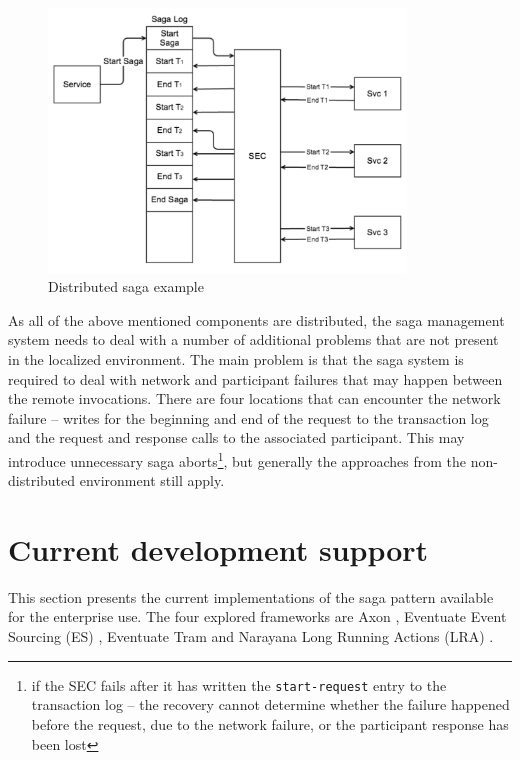 \documentclass[oneside,
  digital, %
  table,   %
  nolof,     %
  nolot,     %
]{fithesis3}
\begin{document}
\begin{figure}
    \begin{center}
        \includegraphics[height=70mm]{images/SEC.png}
    \end{center}
    \caption{Distributed saga example \cite{applying_saga_pattern}}
    \label{fig:SEC}
\end{figure}

As all of the above mentioned components are distributed, the saga management system needs to deal with a number of additional problems that are not present in the localized environment. The main problem is that the saga system is required to deal with network and participant failures that may happen between the remote invocations. There are four locations that can encounter the network failure -- writes for the beginning and end of the request to the transaction log and the request and response calls to the associated participant. This may introduce unnecessary saga aborts\footnote{if the SEC fails after it has written the \texttt{start-request} entry to the transaction log -- the recovery cannot determine whether the failure happened before the request, due to the network failure, or the participant response has been lost}, but generally the approaches from the non-distributed environment still apply.

\section{Current development support}

This section presents the current implementations of the saga pattern available for the enterprise use. The four explored frameworks are Axon \cite{axon_framework}, Eventuate Event Sourcing (ES) \cite{eventuate.io}, Eventuate Tram \cite{eventuate-tram} and Narayana Long Running Actions (LRA) \cite{narayana_lra}.
\end{document}
